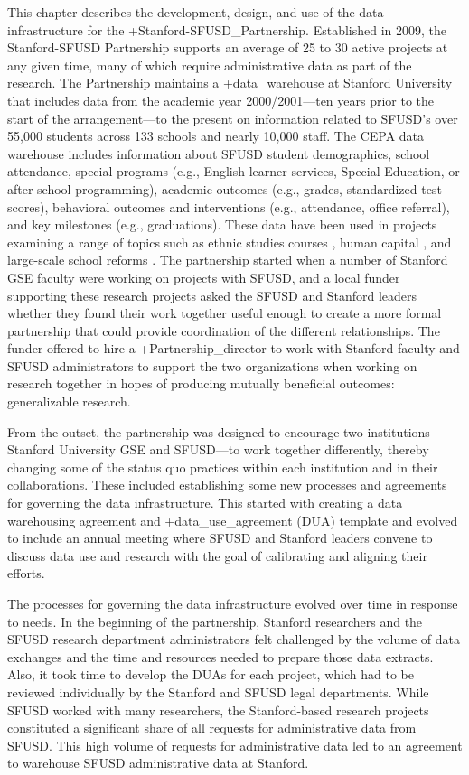 \documentclass[
]{WileySix}
\begin{document}
This chapter describes the development, design, and use of the data infrastructure for the +Stanford-SFUSD\_Partnership\textbar. Established in 2009, the Stanford-SFUSD Partnership supports an average of 25 to 30 active projects at any given time, many of which require administrative data as part of the research. The Partnership maintains a +data\_warehouse\textbar{} at Stanford University that includes data from the academic year 2000/2001---ten years prior to the start of the arrangement---to the present on information related to SFUSD's over 55,000 students across 133 schools and nearly 10,000 staff. The CEPA data warehouse includes information about SFUSD student demographics, school attendance, special programs (e.g., English learner services, Special Education, or after-school programming), academic outcomes (e.g., grades, standardized test scores), behavioral outcomes and interventions (e.g., attendance, office referral), and key milestones (e.g., graduations). These data have been used in projects examining a range of topics such as ethnic studies courses \citep{dee2017}, human capital \citep{dizon-ross2019}, and large-scale school reforms \citep{sun2017}. The partnership started when a number of Stanford GSE faculty were working on projects with SFUSD, and a local funder supporting these research projects asked the SFUSD and Stanford leaders whether they found their work together useful enough to create a more formal partnership that could provide coordination of the different relationships. The funder offered to hire a +Partnership\_director\textbar{} to work with Stanford faculty and SFUSD administrators to support the two organizations when working on research together in hopes of producing mutually beneficial outcomes: generalizable research.

From the outset, the partnership was designed to encourage two institutions---Stanford University GSE and SFUSD---to work together differently, thereby changing some of the status quo practices within each institution and in their collaborations. These included establishing some new processes and agreements for governing the data infrastructure. This started with creating a data warehousing agreement and +data\_use\_agreement\textbar{} (DUA) template and evolved to include an annual meeting where SFUSD and Stanford leaders convene to discuss data use and research with the goal of calibrating and aligning their efforts.

The processes for governing the data infrastructure evolved over time in response to needs. In the beginning of the partnership, Stanford researchers and the SFUSD research department administrators felt challenged by the volume of data exchanges and the time and resources needed to prepare those data extracts. Also, it took time to develop the DUAs for each project, which had to be reviewed individually by the Stanford and SFUSD legal departments. While SFUSD worked with many researchers, the Stanford-based research projects constituted a significant share of all requests for administrative data from SFUSD. This high volume of requests for administrative data led to an agreement to warehouse SFUSD administrative data at Stanford.
\end{document}
